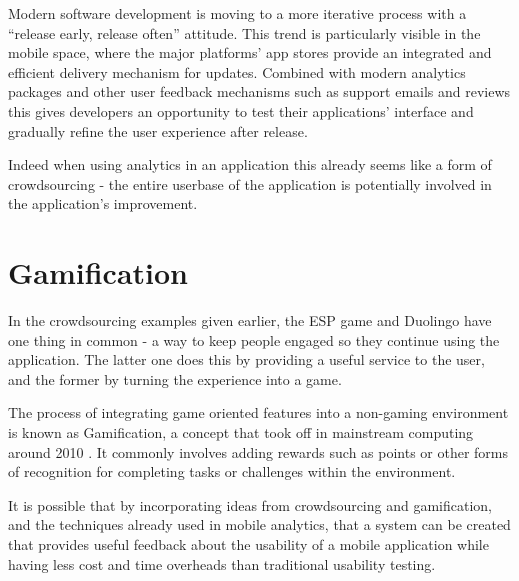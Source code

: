 Modern software development is moving to a more iterative process with a ``release early, release often'' attitude. This trend is particularly visible in the mobile space, where the major platforms' app stores provide an integrated and efficient delivery mechanism for updates. Combined with modern analytics packages and other user feedback mechanisms such as support emails and reviews this gives developers an opportunity to test their applications' interface and gradually refine the user experience after release.

Indeed when using analytics in an application this already seems like a form of crowdsourcing - the entire userbase of the application is potentially involved in the application's improvement. 

\section{Gamification}

In the crowdsourcing examples given earlier, the ESP game and Duolingo have one thing in common - a way to keep people engaged so they continue using the application. The latter one does this by providing a useful service to the user, and the former by turning the experience into a game.

The process of integrating game oriented features into a non-gaming environment is known as Gamification, a concept that took off in mainstream computing around 2010 \cite{gamification-trends}. It commonly involves adding rewards such as points or other forms of recognition for completing tasks or challenges within the environment.

It is possible that by incorporating ideas from crowdsourcing and gamification, and the techniques already used in mobile analytics, that a system can be created that provides useful feedback about the usability of a mobile application while having less cost and time overheads than traditional usability testing.
